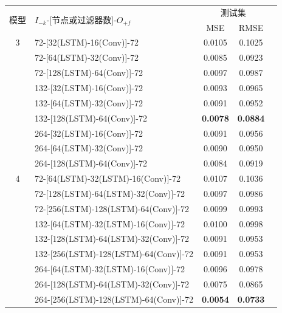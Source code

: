 \begin{table}[!htbp]
  \centering
  \label{tab:ss_area_out_72}
  \footnotesize
  \renewcommand{\arraystretch}{1}
  \begin{tabular}{clccc}
    \toprule
    \multirow{2}{*}{模型} & \multirow{2}{*}{$I_{-k}$-[节点或过滤器数]-$O_{+f}$} & \multicolumn{2}{c}{测试集}\\
    \cmidrule(lr){3-4}
    \noalign{\smallskip}
    & & MSE & RMSE\\
    \midrule 
    3 & 72-[32(LSTM)-16(Conv)]-72 & 0.0105 & 0.1025 \\ 
      & 72-[64(LSTM)-32(Conv)]-72 & 0.0085 & 0.0923 \\
      & 72-[128(LSTM)-64(Conv)]-72 & 0.0097 & 0.0987 \\
      & 132-[32(LSTM)-16(Conv)]-72 & 0.0093 & 0.0965 \\
      & 132-[64(LSTM)-32(Conv)]-72 & 0.0091 & 0.0952 \\
      & 132-[128(LSTM)-64(Conv)]-72 & \textbf{0.0078} & \textbf{0.0884} \\
      & 264-[32(LSTM)-16(Conv)]-72 & 0.0091 & 0.0956 \\
      & 264-[64(LSTM)-32(Conv)]-72 & 0.0090 & 0.0950 \\
      & 264-[128(LSTM)-64(Conv)]-72 & 0.0084 & 0.0919 \\
    \hline
    4 & 72-[64(LSTM)-32(LSTM)-16(Conv)]-72 & 0.0107 & 0.1036 \\
      & 72-[128(LSTM)-64(LSTM)-32(Conv)]-72 & 0.0097 & 0.0986 \\
      & 72-[256(LSTM)-128(LSTM)-64(Conv)]-72 & 0.0099 & 0.0993 \\
      & 132-[64(LSTM)-32(LSTM)-16(Conv)]-72 & 0.0100 & 0.0998 \\
      & 132-[128(LSTM)-64(LSTM)-32(Conv)]-72 & 0.0091 & 0.0953 \\
      & 132-[256(LSTM)-128(LSTM)-64(Conv)]-72 & 0.0091 & 0.0953\\
      & 264-[64(LSTM)-32(LSTM)-16(Conv)]-72 & 0.0096 & 0.0978 \\
      & 264-[128(LSTM)-64(LSTM)-32(Conv)]-72 & 0.0075 & 0.0865 \\
      & 264-[256(LSTM)-128(LSTM)-64(Conv)]-72 & \textbf{0.0054} & \textbf{0.0733} \\

\end{tabular}
\end{table}

